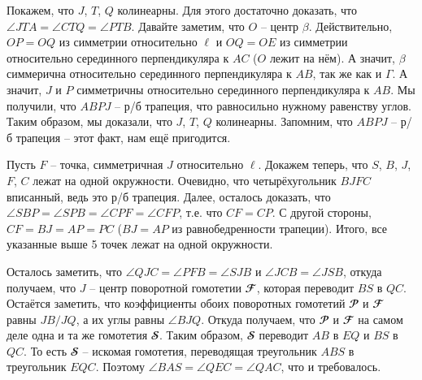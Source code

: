 \documentclass[14pt]{extarticle}
\newcommand{\F}{\mathbfcal{F}}
\renewcommand{\P}{\mathbfcal{P}}
\renewcommand{\S}{\mathbfcal{S}}
\begin{document}
Покажем, что \(J\), \(T\), \(Q\) колинеарны. 
Для этого достаточно доказать, что 
\(\angle JTA = \angle CTQ = \angle PTB\).
Давайте заметим, что \(O\) -- центр \(\beta\). Действительно, 
\(OP = OQ\) из симметрии относительно \(\ell\) и \(OQ = OE\) 
из симметрии относительно серединного перпендикуляра к \(AC\) 
(\(O\) лежит на нём). А значит, \(\beta\) симмерична 
относительно серединного перпендикуляра к \(AB\), так же как и 
\(\Gamma\). А значит, \(J\) и \(P\) симметричны относительно 
серединного перпендикуляра к \(AB\). Мы получили, что 
\(ABPJ\) -- р/б трапеция, что равносильно нужному равенству углов. 
Таким образом, мы доказали, что \(J\), \(T\), \(Q\) колинеарны.
Запомним, что \(ABPJ\) -- р/б трапеция -- этот факт, нам ещё 
пригодится.

Пусть \(F\) -- точка, симметричная \(J\) относительно \(\ell\). 
Докажем теперь, что \(S\), \(B\), \(J\), \(F\), \(C\) лежат на 
одной окружности. Очевидно, что четырёхугольник \(BJFC\) 
вписанный, ведь это 
р/б трапеция. Далее, осталось доказать, что \(\angle SBP = 
\angle SPB = \angle CPF = \angle CFP\), т.е. что \(CF = CP\).
С другой стороны, \(CF = BJ = AP = PC\) (\(BJ = AP\) из равнобедренности 
трапеции). Итого, все указанные выше 5 точек лежат на одной 
окружности.%

Осталось заметить, что \(\angle QJC = \angle PFB = \angle SJB\) и
\(\angle JCB = \angle JSB\), откуда получаем, что \(J\) -- 
центр поворотной гомотетии \(\F\), которая переводит \(BS\) в 
\(QC\). Остаётся заметить, что коэффициенты обоих поворотных 
гомотетий 
\(\P\) и \(\F\) равны \(JB/JQ\), а их углы равны \(\angle BJQ\).
Откуда получаем, что \(\P\) и \(\F\) на самом деле одна и та же 
гомотетия \(\S\). Таким образом, \(\S\) переводит \(AB\) в \(EQ\) 
и \(BS\) в \(QC\). То есть \(\S\) -- искомая гомотетия, 
переводящая треугольник \(ABS\) в треугольник \(EQC\). Поэтому 
\(\angle BAS = \angle QEC = \angle QAC\), что и требовалось.
\end{document}
